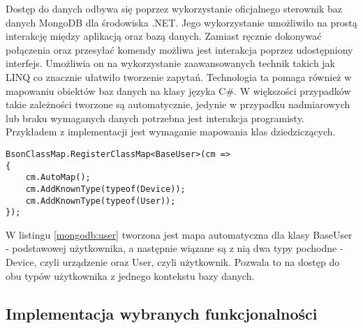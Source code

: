 Dostęp do danych odbywa się poprzez wykorzystanie oficjalnego sterownik
baz danych MongoDB dla środowiska .NET. Jego wykorzystanie 
umożliwiło na prostą interakcję między aplikacją oraz bazą
danych. Zamiast ręcznie dokonywać połączenia oraz przesyłać
komendy możliwa jest interakcja poprzez udostępniony interfejs.
Umożliwia on na wykorzystanie zaawansowanych technik takich jak
LINQ co znacznie ułatwiło tworzenie zapytań. Technologia ta
pomaga również w mapowaniu obiektów baz danych na klasy języka C\#.
W większości przypadków takie zależności tworzone są automatycznie,
jedynie w przypadku nadmiarowych lub braku wymaganych danych potrzebna
jest interakcja programisty. Przykładem z implementacji jest wymaganie
mapowania klas dziedziczących.
\begin{lstlisting}[language={[Sharp]C},caption={Tworzenie mapy klas dla typów użytkownika},label={mongodb:user},captionpos=b]
BsonClassMap.RegisterClassMap<BaseUser>(cm =>
{
    cm.AutoMap();
    cm.AddKnownType(typeof(Device));
    cm.AddKnownType(typeof(User));
});
\end{lstlisting}
W listingu \ref{mongodb:user} tworzona jest mapa automatyczna dla klasy BaseUser - podstawowej
użytkownika, a następnie wiązane są z nią dwa typy pochodne - Device, czyli urządzenie
oraz User, czyli użytkownik. Pozwala to na dostęp do obu typów użytkownika
z jednego kontekstu bazy danych.


\subsection{Implementacja wybranych funkcjonalności}

